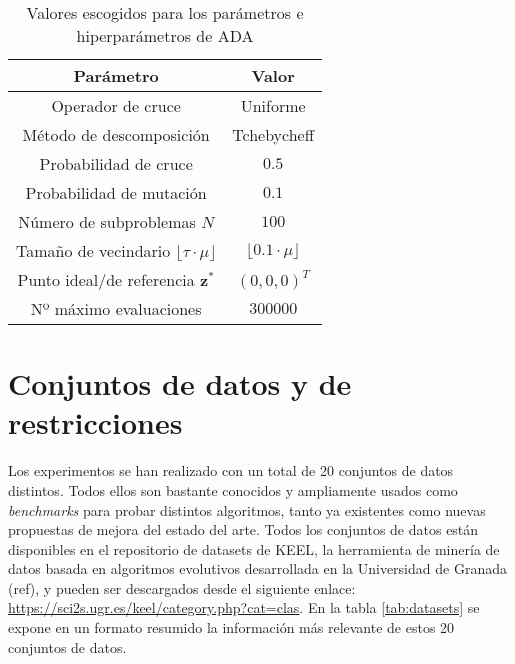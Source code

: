 \begin{table}[h]
\centering
\caption{Valores escogidos para los parámetros e hiperparámetros de ADA}
\begin{tabular}{|cc|}
\hline
Parámetro & Valor \\
\hline
Operador de cruce & Uniforme\\
Método de descomposición & Tchebycheff\\
Probabilidad de cruce & $0.5$\\
Probabilidad de mutación & $0.1$\\
Número de subproblemas $N$ & $100$\\
Tamaño de vecindario $\lfloor\tau \cdot \mu\rfloor$ & $\lfloor 0.1 \cdot \mu \rfloor$\\
Punto ideal/de referencia $\textbf{z}^*$ & $(0,0,0)^T$\\
Nº máximo evaluaciones & $300000$\\

\hline
\end{tabular}
\label{tab:adaparams}
\end{table}



\section{Conjuntos de datos y de restricciones}

Los experimentos se han realizado con un total de 20 conjuntos de datos distintos. Todos ellos son bastante conocidos y ampliamente usados como \emph{benchmarks} para probar distintos algoritmos, tanto ya existentes como nuevas propuestas de mejora del estado del arte. Todos los conjuntos de datos están disponibles en el repositorio de datasets de KEEL, la herramienta de minería de datos basada en algoritmos evolutivos desarrollada en la Universidad de Granada (ref), y pueden ser descargados desde el siguiente enlace: \url{https://sci2s.ugr.es/keel/category.php?cat=clas}. En la tabla \ref{tab:datasets} se expone en un formato resumido la información más relevante de estos 20 conjuntos de datos.


